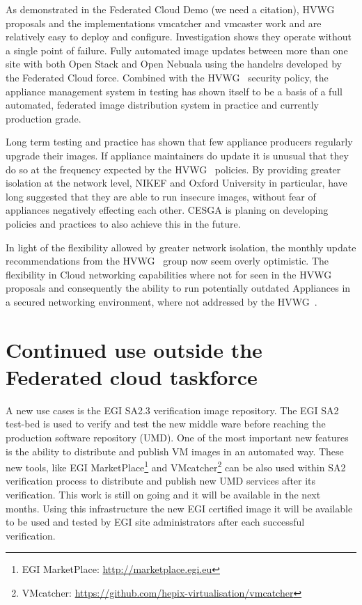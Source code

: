 \documentclass{llncs_Ibergrid2013}
\begin{document}
As demonstrated in the Federated Cloud Demo (we need a citation), HVWG~\cite{hepix} proposals and the implementations vmcatcher and vmcaster work and are relatively easy to deploy and configure. Investigation shows they operate without a single point of failure. Fully automated image updates between more than one site with both Open Stack and Open Nebuala using the handelrs developed by the Federated Cloud force. Combined with the HVWG~\cite{hepix} security policy, the appliance management system in testing has shown itself to be a basis of a full automated, federated image distribution system in practice and currently production grade.

Long term testing and practice has shown that few appliance producers regularly upgrade their images. If appliance maintainers do update it is unusual that they do so at the frequency expected by the HVWG~\cite{hepix} policies. By providing greater isolation at the network level, NIKEF and Oxford University in particular, have long suggested that they are able to run insecure images, without fear of appliances negatively effecting each other. CESGA is planing on developing policies and practices to also achieve this in the future.

In light of the flexibility allowed by greater network isolation, the monthly update recommendations from the HVWG~\cite{hepix} group now seem overly optimistic. The flexibility in Cloud networking capabilities where not for seen in the HVWG~\cite{hepix} proposals and consequently the ability to run potentially outdated Appliances in a secured networking environment, where not addressed by the HVWG~\cite{hepix}.
\section{Continued use outside the Federated cloud taskforce}
\label{sect-continued}

A new use cases is the EGI SA2.3 verification image repository. The EGI SA2 test-bed is used to verify and test the new middle ware before reaching the production software repository (UMD).
One of the most important new features is the ability to distribute and publish VM images in an automated way. 
These new tools, like EGI MarketPlace\footnote{EGI MarketPlace: \url{http://marketplace.egi.eu}} and VMcatcher\footnote{VMcatcher: \url{https://github.com/hepix-virtualisation/vmcatcher}} can be also used within SA2 verification process to distribute and publish new UMD services after its verification. 
This work is still on going and it will be available in the next months. Using this infrastructure the new EGI certified image it will be available to be used and tested by EGI site administrators after each successful verification.
\end{document}
